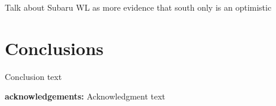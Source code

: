 Talk about Subaru WL as more evidence that south only is an optimistic

\section{Conclusions}

Conclusion text

\textbf{acknowledgements:}
Acknowledgment text

%



%
%  
